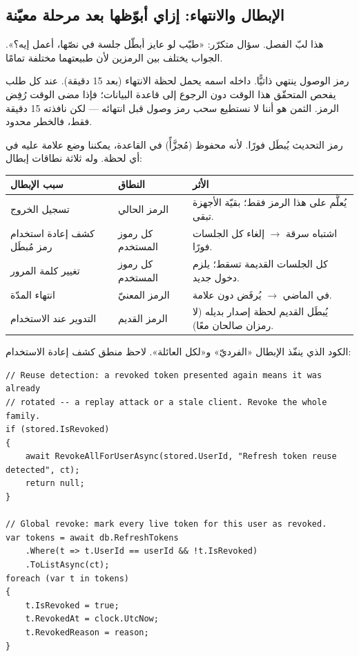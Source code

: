 \subsection{الإبطال والانتهاء: إزاي أبوّظها بعد مرحلة معيّنة}

هذا لبّ الفصل. سؤال متكرّر: «طيّب لو عايز أبطّل جلسة في نصّها، أعمل إيه؟». الجواب
يختلف بين الرمزين لأن طبيعتهما مختلفة تمامًا.

رمز الوصول ينتهي ذاتيًّا. داخله  اسمه  يحمل لحظة الانتهاء (بعد
15 دقيقة). عند كل طلب يفحص المتحقّق هذا الوقت دون الرجوع إلى قاعدة البيانات؛ فإذا
مضى الوقت رُفِض الرمز. الثمن هو أننا لا نستطيع سحب رمز وصول قبل انتهائه — لكن نافذته
15 دقيقة فقط، فالخطر محدود.

رمز التحديث يُبطَل فورًا. لأنه محفوظ (مُجزَّأً) في القاعدة، يمكننا وضع علامة عليه في
أي لحظة. وله ثلاثة نطاقات إبطال:

\begin{center}
\begin{tabular}{L{4.3cm} L{3.2cm} L{6.8cm}}
\toprule
{\bfseries\color{spPrimary}سبب الإبطال} & {\bfseries\color{spPrimary}النطاق} & {\bfseries\color{spPrimary}الأثر} \\
\midrule
تسجيل الخروج & الرمز الحالي & يُعلَّم  على هذا الرمز فقط؛ بقيّة الأجهزة تبقى. \\
كشف إعادة استخدام رمز مُبطَل & كل رموز المستخدم & اشتباه سرقة $\rightarrow$ إلغاء كل الجلسات فورًا. \\
تغيير كلمة المرور & كل رموز المستخدم & كل الجلسات القديمة تسقط؛ يلزم دخول جديد. \\
انتهاء المدّة & الرمز المعنيّ &  في الماضي $\rightarrow$ يُرفَض دون علامة. \\
التدوير عند الاستخدام & الرمز القديم & يُبطَل القديم لحظة إصدار بديله (لا رمزان صالحان معًا). \\
\bottomrule
\end{tabular}
\end{center}

الكود الذي ينفّذ الإبطال «الفرديّ» و«لكل العائلة». لاحظ منطق كشف إعادة الاستخدام:

\begin{english}
\begin{lstlisting}[language={[Sharp]C}]
// Reuse detection: a revoked token presented again means it was already
// rotated -- a replay attack or a stale client. Revoke the whole family.
if (stored.IsRevoked)
{
    await RevokeAllForUserAsync(stored.UserId, "Refresh token reuse detected", ct);
    return null;
}

// Global revoke: mark every live token for this user as revoked.
var tokens = await db.RefreshTokens
    .Where(t => t.UserId == userId && !t.IsRevoked)
    .ToListAsync(ct);
foreach (var t in tokens)
{
    t.IsRevoked = true;
    t.RevokedAt = clock.UtcNow;
    t.RevokedReason = reason;
}
\end{lstlisting}
\end{english}

